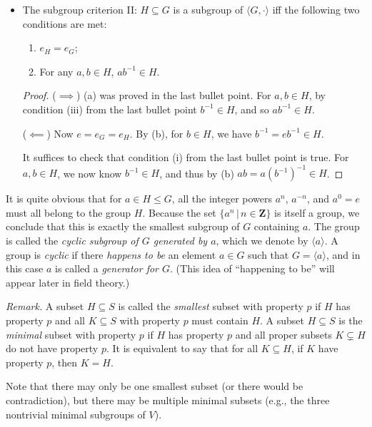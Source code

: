 \documentclass[11pt]{article}
\newcommand{\rmk}{\noindent\textit{Remark. }}
\newcommand{\where}{\,|\,}
\newcommand{\Z}{\mathbf{Z}}
\newcommand{\df}[1]{\textit{\textsf{#1}}}
\newcommand{\la}{\langle}
\newcommand{\ra}{\rangle}
\begin{document}
\begin{itemize}
\begin{proof}
        ($\impliedby$) Remember associativity is inherited.
    \end{proof}
    \item The subgroup criterion II: $H \subseteq G$ is a subgroup of $\la G,\cdot \ra$ iff the following two conditions are met:
    \begin{enumerate}[label=(\alph*)]
        \item $e_H = e_G$;
        \item For any $a,b \in H$, $ab^{-1} \in H$.
    \end{enumerate}
    \begin{proof}
        ($\implies$) (a) was proved in the last bullet point. For $a,b \in H$, by condition (iii) from the last bullet point $b^{-1} \in H$, and so $ab^{-1} \in H$.

        ($\impliedby$) Now $e = e_G = e_H$. By (b), for $b \in H$, we have $b^{-1} = eb^{-1} \in H$.
        
        It suffices to check that condition (i) from the last bullet point is true. For $a,b \in H$, we now know $b^{-1} \in H$, and thus by (b) $ab = a(b^{-1})^{-1} \in H$.
    \end{proof}
\end{itemize}
\begin{framed}
    It is quite obvious that for $a \in H \leq G$, all the integer powers $a^n$, $a^{-n}$, and $a^0 = e$ must all belong to the group $H$. Because the set $\{a^n \where n \in \Z\}$ is itself a group, we conclude that this is exactly the smallest subgroup of $G$ containing $a$. The group is called the \df{cyclic subgroup of $G$ generated by $a$}, which we denote by $\la a \ra$. A group is \df{cyclic} if there \emph{happens to be} an element $a \in G$ such that $G = \la a \ra$, and in this case $a$ is called a \df{generator for $G$}. (This idea of ``happening to be'' will appear later in field theory.)
\end{framed}
\rmk A subset $H \subseteq S$ is called the \df{smallest} subset with property $p$ if $H$ has property $p$ and all $K \subseteq S$ with property $p$ must contain $H$. A subset $H \subseteq S$ is the \df{minimal} subset with property $p$ if $H$ has property $p$ and all proper subsets $K \subsetneq H$ do not have property $p$. It is equivalent to say that for all $K \subseteq H$, if $K$ have property $p$, then $K = H$.

Note that there may only be one smallest subset (or there would be contradiction), but there may be multiple minimal subsets (e.g., the three nontrivial minimal subgroups of $V$).
\end{document}
